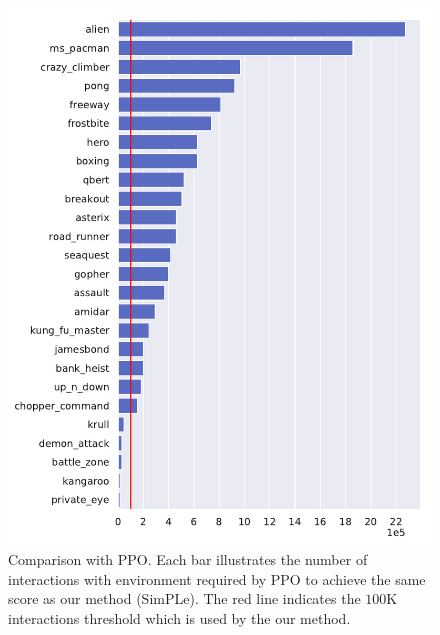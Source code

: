 \begin{figure}[t]
\centering
\includegraphics[width=1.0\columnwidth]{figures/v1_eval_longmodel_vs_ppo-1.png}
\caption{Comparison with PPO. Each bar illustrates the number of interactions with environment required by PPO to achieve the same score as our method (SimPLe). The red line indicates the $100$K interactions threshold which is used by the our method.}
\label{fig:compare_ppo}
\end{figure}

